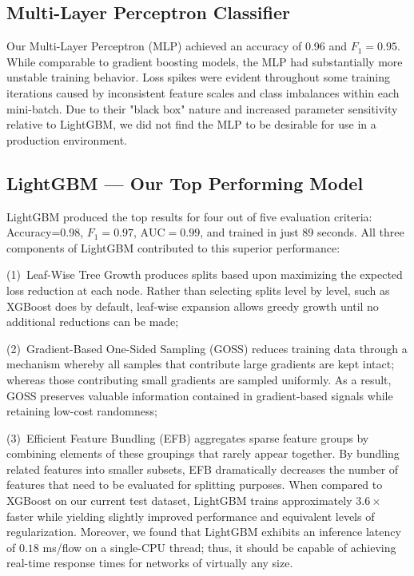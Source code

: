 \subsection{Multi-Layer Perceptron Classifier}

Our Multi-Layer Perceptron (MLP) achieved an accuracy of 0.96 and $F_1 = 0.95$. While comparable to gradient boosting models, the MLP had substantially more unstable training behavior. Loss spikes were evident throughout some training iterations caused by inconsistent feature scales and class imbalances within each mini-batch. Due to their "black box" nature and increased parameter sensitivity relative to LightGBM, we did not find the MLP to be desirable for use in a production environment.

\subsection{LightGBM — Our Top Performing Model}

LightGBM produced the top results for four out of five evaluation criteria: Accuracy=0.98, $F_1 = 0.97$, $\mathrm{AUC} = 0.99$, and trained in just 89 seconds. All three components of LightGBM contributed to this superior performance:

(1)~Leaf-Wise Tree Growth produces splits based upon maximizing the expected loss reduction at each node. Rather than selecting splits level by level, such as XGBoost does by default, leaf-wise expansion allows greedy growth until no additional reductions can be made;

(2)~Gradient-Based One-Sided Sampling (GOSS) reduces training data through a mechanism whereby all samples that contribute large gradients are kept intact; whereas those contributing small gradients are sampled uniformly. As a result, GOSS preserves valuable information contained in gradient-based signals while retaining low-cost randomness;

(3)~Efficient Feature Bundling (EFB) aggregates sparse feature groups by combining elements of these groupings that rarely appear together. By bundling related features into smaller subsets, EFB dramatically decreases the number of features that need to be evaluated for splitting purposes. When compared to XGBoost on our current test dataset, LightGBM trains approximately $3.6\times$ faster while yielding slightly improved performance and equivalent levels of regularization. Moreover, we found that LightGBM exhibits an inference latency of $0.18$ ms/flow on a single-CPU thread; thus, it should be capable of achieving real-time response times for networks of virtually any size.

